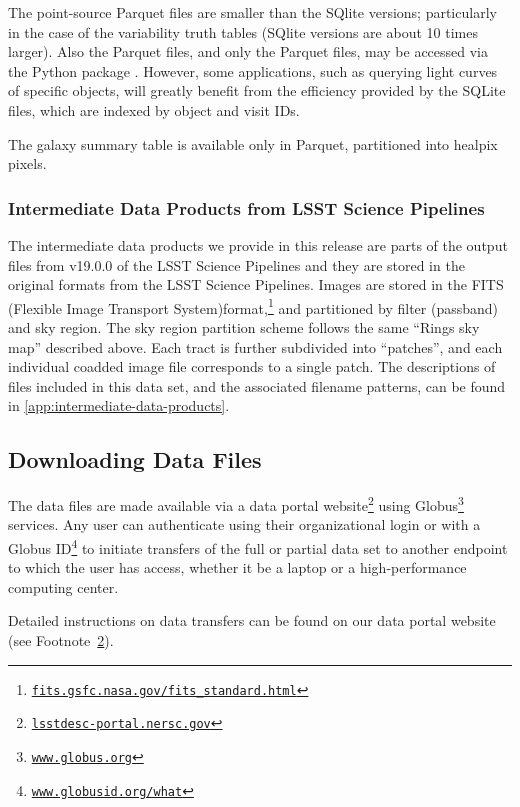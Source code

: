 \documentclass[modern]{descnote}
\newcommand*{\https}[1]{\href{https://#1}{\nolinkurl{#1}}}
\begin{document}
The point-source Parquet files are smaller than the SQlite versions; particularly in the case of the variability truth tables (SQlite versions are about 10 times larger).  Also the Parquet files, and only the Parquet files, may be accessed via the Python package . However, some applications, such as querying light curves of specific objects, will greatly benefit from the efficiency provided by the SQLite files, which are indexed by object and visit IDs.

The galaxy summary table is available only in Parquet, partitioned into healpix pixels.  

\subsubsection{Intermediate Data Products from LSST Science Pipelines}
\label{sec:representation-intermediate}


The intermediate data products we provide in this release are parts of the output files from v19.0.0 of the LSST Science Pipelines and they are stored in the original formats from the LSST Science Pipelines. Images are stored in the FITS (Flexible Image Transport System)format,\footnote{\https{fits.gsfc.nasa.gov/fits_standard.html}} and partitioned by filter (passband) and sky region. The sky region partition scheme follows the same ``Rings sky map'' described above. Each tract is further subdivided into ``patches'', and each individual coadded image file corresponds to a single patch. The descriptions of files included in this data set, and the associated filename patterns, can be found in \autoref{app:intermediate-data-products}. 


\subsection{Downloading Data Files}
\label{sec:download}

The data files are made available via a data portal website\footnote{\https{lsstdesc-portal.nersc.gov}\label{fn:portal}} using Globus\footnote{\https{www.globus.org}} services. Any user can authenticate using their organizational login or with a Globus ID\footnote{\https{www.globusid.org/what}} to initiate transfers of the full or partial data set to another endpoint to which the user has access, whether it be a laptop or a high-performance computing center. 

Detailed instructions on data transfers can be found on our data portal website (see Footnote~\ref{fn:portal}).
\end{document}
